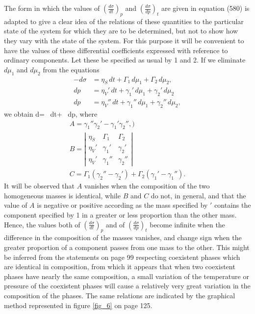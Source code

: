 \documentclass[12pt]{article}
\begin{document}
{The form in which the values of $\left(\frac{d\sigma}{dt}\right)_p$ and $\left(\frac{d\sigma}{dp}\right)_t$ are given in equation (580) is adapted to give a clear idea of the relations of these quantities to the particular state of the system for which they are to be determined, but not to show how they vary with the state of the system. For this purpose it will be convenient to have the values of these differential coefficients expressed with reference to ordinary components. Let these be specified as usual by 1 and 2. If we eliminate $d\mu_1$ and $d\mu_2$ from the equations
\begin{align*}-d\sigma &= \eta_S \,dt + \Gamma_1 \, d\mu_1 +\Gamma_2 \, d\mu_2, \\
dp &= \eta_V' \,dt + \gamma_1' \, d\mu_1 +\gamma_2' \, d\mu_2  \\
dp &= \eta_V'' \,dt + \gamma_1'' \, d\mu_1 +\gamma_2'' \, d\mu_2, \end{align*}
we obtain
\eqs d\sigma= \, dt+ \, dp,  \label{581} \eqe
where
\begin{gather}
A = \gamma_1''\gamma_2' - \gamma_1'\gamma_2'',  \label{582}) \\
B=  \left| \begin{array}{ccc} 
\eta_S & \Gamma_1 & \Gamma_2  \\
\eta_V' & \gamma_1' & \gamma_2'  \\
\eta_V' & \gamma_1'' & \gamma_2'' \end{array}\right|     \label{583} \\
C= \Gamma_1(\gamma_2'' - \gamma_2')+ \Gamma_2(\gamma_1' - \gamma_1'').   \label{584} \end{gather}
It will be observed that $A$ vanishes when the composition of the two homogeneous masses is identical, while $B$ and $C$ do not, in general, and that the value of $A$ is negative or positive according as the mass specified by $'$ contains the component specified by 1 in a greater or less proportion than the other mass.  Hence, the values both of $\left(\frac{d\sigma}{dt}\right)_p$ and of $\left(\frac{d\sigma}{dp}\right)_t$ become infinite when the difference in the composition of the masses vanishes, and change sign when the greater proportion of a component passes from one mass to the other. This might be inferred from the statements on page 99 respecting coexistent phases which are identical in composition, from which it appears that when two coexistent phases have nearly the same composition, a small variation of the temperature or pressure of the coexistent phases will cause a relatively very great variation in the composition of the phases. The same relations are indicated by the graphical method represented in figure \ref{fig_6} on page 125.

}
\end{document}
